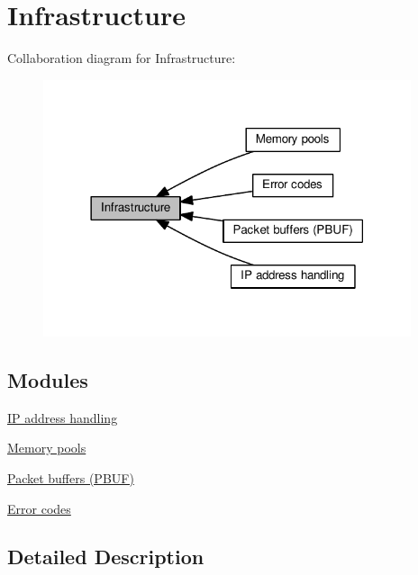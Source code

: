 \hypertarget{group__infrastructure}{}\section{Infrastructure}
\label{group__infrastructure}
Collaboration diagram for Infrastructure\+:
\nopagebreak
\begin{figure}[H]
\begin{center}
\leavevmode
\includegraphics[width=306pt]{group__infrastructure}
\end{center}
\end{figure}
\subsection*{Modules}
\begin{DoxyCompactItemize}
\item 
\hyperlink{group__ipaddr}{I\+P address handling}
\item 
\hyperlink{group__mempool}{Memory pools}
\item 
\hyperlink{group__pbuf}{Packet buffers (\+P\+B\+U\+F)}
\item 
\hyperlink{group__infrastructure__errors}{Error codes}
\end{DoxyCompactItemize}


\subsection{Detailed Description}
